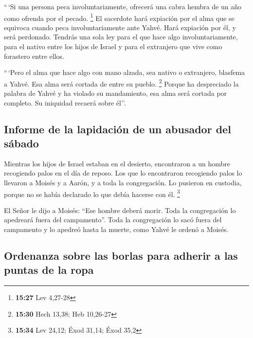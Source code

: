  ``\,`Si una persona peca involuntariamente, ofrecerá una
cabra hembra de un año como ofrenda por el pecado. \footnote{\textbf{15:27}
  Lev 4,27-28}  El sacerdote hará expiación por el alma
que se equivoca cuando peca involuntariamente ante Yahvé. Hará expiación
por él, y será perdonado.  Tendrás una sola ley para el
que hace algo involuntariamente, para el nativo entre los hijos de
Israel y para el extranjero que vive como forastero entre ellos.

 ``\,`Pero el alma que hace algo con mano alzada, sea
nativo o extranjero, blasfema a Yahvé. Esa alma será cortada de entre su
pueblo. \footnote{\textbf{15:30} Hech 13,38; Heb 10,26-27}
 Porque ha despreciado la palabra de Yahvé y ha violado
su mandamiento, esa alma será cortada por completo. Su iniquidad recaerá
sobre él''.

\hypertarget{informe-de-la-lapidaciuxf3n-de-un-abusador-del-suxe1bado}{%
\subsection{Informe de la lapidación de un abusador del
sábado}\label{informe-de-la-lapidaciuxf3n-de-un-abusador-del-suxe1bado}}

 Mientras los hijos de Israel estaban en el desierto,
encontraron a un hombre recogiendo palos en el día de reposo.
 Los que lo encontraron recogiendo palos lo llevaron a
Moisés y a Aarón, y a toda la congregación.  Lo pusieron
en custodia, porque no se había declarado lo que debía hacerse con él.
\footnote{\textbf{15:34} Lev 24,12; Éxod 31,14; Éxod 35,2}

 El Señor le dijo a Moisés: ``Ese hombre deberá morir.
Toda la congregación lo apedreará fuera del campamento''.
 Toda la congregación lo sacó fuera del campamento y lo
apedreó hasta la muerte, como Yahvé le ordenó a Moisés.

\hypertarget{ordenanza-sobre-las-borlas-para-adherir-a-las-puntas-de-la-ropa}{%
\subsection{Ordenanza sobre las borlas para adherir a las puntas de la
ropa}\label{ordenanza-sobre-las-borlas-para-adherir-a-las-puntas-de-la-ropa}}

